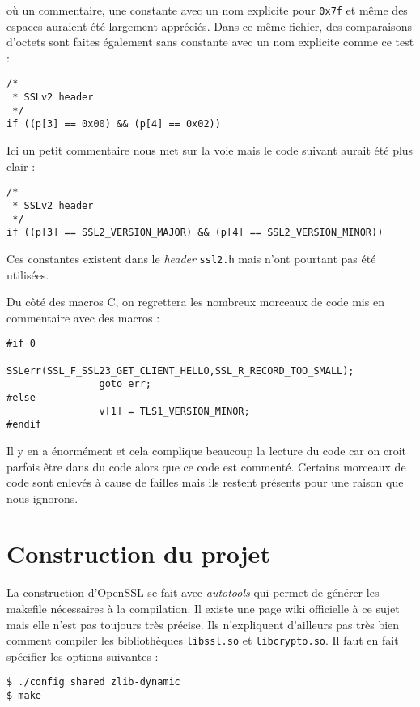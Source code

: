 où un commentaire, une constante avec un nom explicite pour \verb+0x7f+ et même des espaces auraient été largement appréciés. Dans ce même fichier, des comparaisons d'octets sont faites également sans constante avec un nom explicite comme ce test :

\begin{lstlisting}[style=customc,label=badcodetest, caption=Exemple de mauvais test d'OpenSSL]
/*
 * SSLv2 header
 */
if ((p[3] == 0x00) && (p[4] == 0x02))
\end{lstlisting}

Ici un petit commentaire nous met sur la voie mais le code suivant aurait été plus clair :
\begin{lstlisting}[style=customc,label=badcodetestfixed, caption=Exemple de mauvais test d'OpenSSL corrigé]
/*
 * SSLv2 header
 */
if ((p[3] == SSL2_VERSION_MAJOR) && (p[4] == SSL2_VERSION_MINOR))
\end{lstlisting}

Ces constantes existent dans le \textit{header} \verb+ssl2.h+ mais n'ont pourtant pas été utilisées.

Du côté des macros C, on regrettera les nombreux morceaux de code mis en commentaire avec des  macros :

\begin{lstlisting}[style=customc,label=badcodeif0, caption=Exemple de mauvais \#if 0 d'OpenSSL]
#if 0
				SSLerr(SSL_F_SSL23_GET_CLIENT_HELLO,SSL_R_RECORD_TOO_SMALL);
				goto err;
#else
				v[1] = TLS1_VERSION_MINOR;
#endif
\end{lstlisting}

Il y en a énormément et cela complique beaucoup la lecture du code car on croit parfois être dans du code alors que ce code est commenté. Certains morceaux de code sont enlevés à cause de failles mais ils restent présents pour une raison que nous ignorons.


\section{Construction du projet}
La construction d'OpenSSL se fait avec \textit{autotools} qui permet de générer les makefile nécessaires à la compilation. Il existe une page wiki officielle à ce sujet mais elle n'est pas toujours très précise. Ils n'expliquent d'ailleurs pas très bien comment compiler les bibliothèques \verb+libssl.so+ et \verb+libcrypto.so+. Il faut en fait spécifier les options suivantes :
\begin{verbatim}
$ ./config shared zlib-dynamic
$ make
\end{verbatim}

